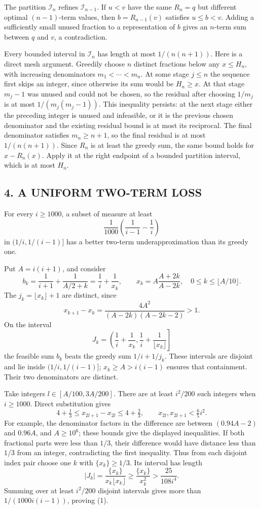 The partition $\mathcal I_n$ refines $\mathcal I_{n-1}$. If $u<v$ have the same $R_n=q$ but different optimal $(n-1)$-term values, then $b=R_{n-1}(v)$ satisfies $u\le b<v$. Adding a sufficiently small unused fraction to a representation of $b$ gives an $n$-term sum between $q$ and $v$, a contradiction.

Every bounded interval in $\mathcal I_n$ has length at most $1/(n(n+1))$. Here is a direct mesh argument. Greedily choose $n$ distinct fractions below any $x\le H_n$, with increasing denominators $m_1<\cdots<m_n$. At some stage $j\le n$ the sequence first skips an integer, since otherwise its sum would be $H_n\ge x$. At that stage $m_j-1$ was unused and could not be chosen, so the residual after choosing $1/m_j$ is at most $1/(m_j(m_j-1))$. This inequality persists: at the next stage either the preceding integer is unused and infeasible, or it is the previous chosen denominator and the existing residual bound is at most its reciprocal. The final denominator satisfies $m_n\ge n+1$, so the final residual is at most $1/(n(n+1))$. Since $R_n$ is at least the greedy sum, the same bound holds for $x-R_n(x)$. Apply it at the right endpoint of a bounded partition interval, which is at most $H_n$.
\subsection*{4. A UNIFORM TWO-TERM LOSS}
For every $i\ge1000$, a subset of measure at least
\[
 \frac{1}{1000}\left(\frac1{i-1}-\frac1i\right)           \tag{1}
\]
in $(1/i,1/(i-1)]$ has a better two-term underapproximation than its greedy one.

Put $A=i(i+1)$, and consider
\[
 b_k=\frac1{i+1}+\frac1{A/2+k}
     =\frac1i+\frac1{x_k},\qquad
 x_k=A\frac{A+2k}{A-2k},\quad 0\le k\le\lfloor A/10\rfloor.
\]
The $j_k=\lfloor x_k\rfloor+1$ are distinct, since
\[
 x_{k+1}-x_k=\frac{4A^2}{(A-2k)(A-2k-2)}>1.
\]
On the interval
\[
 J_k=\left(\frac1i+\frac1{x_k},\frac1i+\frac1{\lfloor x_k\rfloor}\right]
\]
the feasible sum $b_k$ beats the greedy sum $1/i+1/j_k$. These intervals are disjoint and lie inside $(1/i,1/(i-1)]$; $x_k\ge A>i(i-1)$ ensures that containment. Their two denominators are distinct.

Take integers $l\in[A/100,3A/200]$. There are at least $i^2/200$ such integers when $i\ge1000$. Direct substitution gives
\[
 4+\tfrac13\le x_{2l+1}-x_{2l}\le4+\tfrac23,
 \qquad x_{2l},x_{2l+1}<\tfrac65 i^2.
\]
For example, the denominator factors in the difference are between $(0.94A-2)$ and $0.96A$, and $A\ge10^6$; these bounds give the displayed inequalities. If both fractional parts were less than $1/3$, their difference would have distance less than $1/3$ from an integer, contradicting the first inequality. Thus from each disjoint index pair choose one $k$ with $\{x_k\}\ge1/3$. Its interval has length
\[
 |J_k|=\frac{\{x_k\}}{x_k\lfloor x_k\rfloor}
 \ge\frac{\{x_k\}}{x_k^2}>\frac{25}{108i^4}.
\]
Summing over at least $i^2/200$ disjoint intervals gives more than $1/(1000i(i-1))$, proving (1).
